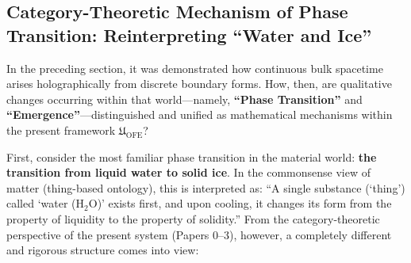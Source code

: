 \documentclass[11pt,a4paper]{article}
\theoremstyle{definition}
\theoremstyle{plain}
\begin{document}
\subsection{Category-Theoretic Mechanism of Phase Transition: Reinterpreting ``Water and Ice''}
In the preceding section, it was demonstrated how continuous bulk spacetime arises holographically from discrete boundary forms. How, then, are qualitative changes occurring within that world---namely, \textbf{``Phase Transition''} and \textbf{``Emergence''}---distinguished and unified as mathematical mechanisms within the present framework $\mathfrak{U}_{\mathrm{OFE}}$?

First, consider the most familiar phase transition in the material world: \textbf{the transition from liquid water to solid ice}. In the commonsense view of matter (thing-based ontology), this is interpreted as: ``A single substance (`thing') called `water ($\mathrm{H_2O}$)' exists first, and upon cooling, it changes its form from the property of liquidity to the property of solidity.'' From the category-theoretic perspective of the present system (Papers 0--3), however, a completely different and rigorous structure comes into view:
\end{document}
